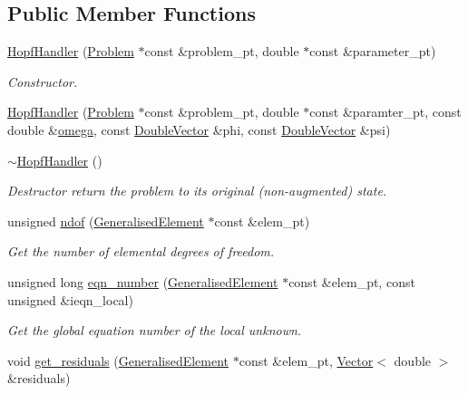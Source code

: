 \subsection*{Public Member Functions}
\begin{DoxyCompactItemize}
\item 
\hyperlink{classoomph_1_1HopfHandler_ac219516b8263300eb5102d38baab05d7}{Hopf\+Handler} (\hyperlink{classoomph_1_1Problem}{Problem} $\ast$const \&problem\+\_\+pt, double $\ast$const \&parameter\+\_\+pt)
\begin{DoxyCompactList}\small\item\em Constructor. \end{DoxyCompactList}\item 
\hyperlink{classoomph_1_1HopfHandler_a5799482b1a7d06cbefcbcc862d33b41a}{Hopf\+Handler} (\hyperlink{classoomph_1_1Problem}{Problem} $\ast$const \&problem\+\_\+pt, double $\ast$const \&paramter\+\_\+pt, const double \&\hyperlink{classoomph_1_1HopfHandler_a788a0cf74664712827f46bf26e078994}{omega}, const \hyperlink{classoomph_1_1DoubleVector}{Double\+Vector} \&phi, const \hyperlink{classoomph_1_1DoubleVector}{Double\+Vector} \&psi)
\item 
\hyperlink{classoomph_1_1HopfHandler_a2b2822861fc417fea32cbba38f9dd650}{$\sim$\+Hopf\+Handler} ()
\begin{DoxyCompactList}\small\item\em Destructor return the problem to its original (non-\/augmented) state. \end{DoxyCompactList}\item 
unsigned \hyperlink{classoomph_1_1HopfHandler_a8d1b73ec4e9b8b27252b4bacf2ef7f38}{ndof} (\hyperlink{classoomph_1_1GeneralisedElement}{Generalised\+Element} $\ast$const \&elem\+\_\+pt)
\begin{DoxyCompactList}\small\item\em Get the number of elemental degrees of freedom. \end{DoxyCompactList}\item 
unsigned long \hyperlink{classoomph_1_1HopfHandler_a9feb8087e8b9554164c0de002f4ec056}{eqn\+\_\+number} (\hyperlink{classoomph_1_1GeneralisedElement}{Generalised\+Element} $\ast$const \&elem\+\_\+pt, const unsigned \&ieqn\+\_\+local)
\begin{DoxyCompactList}\small\item\em Get the global equation number of the local unknown. \end{DoxyCompactList}\item 
void \hyperlink{classoomph_1_1HopfHandler_a61a4006161da6532a9acfec0f979aafa}{get\+\_\+residuals} (\hyperlink{classoomph_1_1GeneralisedElement}{Generalised\+Element} $\ast$const \&elem\+\_\+pt, \hyperlink{classoomph_1_1Vector}{Vector}$<$ double $>$ \&residuals)

\end{DoxyCompactItemize}
